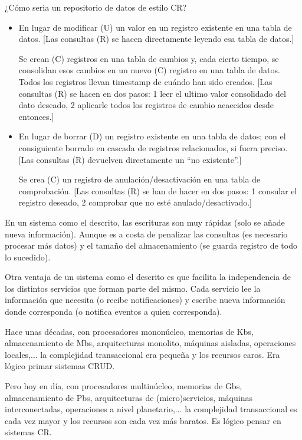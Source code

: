 \documentclass[spanish,12pt,a4paper,final,oneside]{book}
\begin{document}
¿Cómo seria un repositorio de datos de estilo CR?
\begin{itemize}

\item En lugar de modificar (U) un valor en un registro existente en una tabla de datos. [Las consultas (R) se hacen directamente leyendo esa tabla de datos.]

Se crean (C) registros en una tabla de cambios y, cada cierto tiempo, se consolidan esos cambios en un nuevo (C) registro en una tabla de datos. Todos los registros llevan timestamp de cuándo han sido creados. [Las consultas (R) se hacen en dos pasos: 1 leer el ultimo valor consolidado del dato deseado, 2 aplicarle todos los registros de cambio acaecidos desde entonces.]

\item En lugar de borrar (D) un registro existente en una tabla de datos; con el consiguiente borrado en cascada de registros relacionados, si fuera preciso. [Las consultas (R) devuelven directamente un ``no existente''.]

Se crea (C) un registro de anulación/desactivación en una tabla de comprobación. [Las consultas (R) se han de hacer en dos pasos: 1 consular el registro deseado, 2 comprobar que no esté anulado/desactivado.]

\end{itemize}

En un sistema como el descrito, las escrituras son muy rápidas (solo se añade nueva información). Aunque es a costa de penalizar las consultas (es necesario procesar más datos) y el tamaño del almacenamiento (se guarda registro de todo lo sucedido).

Otra ventaja de un sistema como el descrito es que facilita la independencia de los distintos servicios que forman parte del mismo. Cada servicio lee la información que necesita (o recibe notificaciones) y escribe nueva información donde corresponda (o notifica eventos a quien corresponda).


Hace unas décadas, con procesadores mononúcleo, memorias de Kbs, almacenamiento de Mbs, arquitecturas monolito, máquinas aisladas, operaciones locales,... la complejidad transaccional era pequeña y los recursos caros. Era lógico primar sistemas CRUD.

Pero hoy en día, con procesadores multinúcleo, memorias de Gbs, almacenamiento de Pbs, arquitecturas de (micro)servicios, máquinas interconectadas, operaciones a nivel planetario,... la complejidad transaccional es cada vez mayor y los recursos son cada vez más baratos. Es lógico pensar en sistemas CR.
\end{document}
